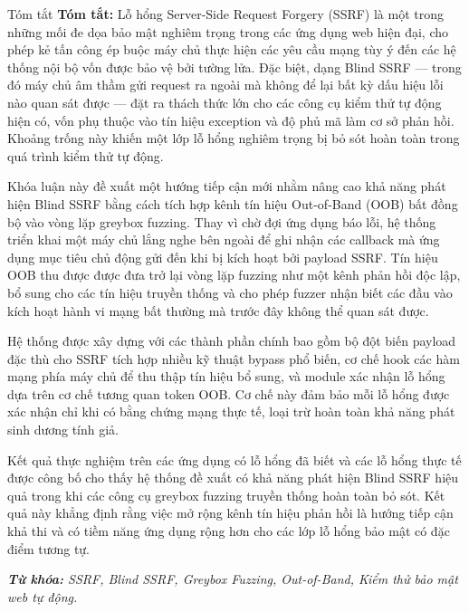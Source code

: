 ﻿\documentclass{uetgraduation}
\begin{document}
\begin{preamble}{Tóm tắt}
\textbf{Tóm tắt:} Lỗ hổng Server-Side Request Forgery (SSRF) là một trong những
mối đe dọa bảo mật nghiêm trọng trong các ứng dụng web hiện đại, cho phép kẻ
tấn công ép buộc máy chủ thực hiện các yêu cầu mạng tùy ý đến các hệ thống
nội bộ vốn được bảo vệ bởi tường lửa. Đặc biệt, dạng Blind SSRF --- trong đó
máy chủ âm thầm gửi request ra ngoài mà không để lại bất kỳ dấu hiệu lỗi nào
quan sát được --- đặt ra thách thức lớn cho các công cụ kiểm thử tự động hiện
có, vốn phụ thuộc vào tín hiệu exception và độ phủ mã làm cơ sở phản hồi.
Khoảng trống này khiến một lớp lỗ hổng nghiêm trọng bị bỏ sót hoàn toàn trong
quá trình kiểm thử tự động.

Khóa luận này đề xuất một hướng tiếp cận mới nhằm nâng cao khả năng phát hiện
Blind SSRF bằng cách tích hợp kênh tín hiệu Out-of-Band (OOB) bất đồng bộ vào
vòng lặp greybox fuzzing. Thay vì chờ đợi ứng dụng báo lỗi, hệ thống triển
khai một máy chủ lắng nghe bên ngoài để ghi nhận các callback mà ứng dụng mục
tiêu chủ động gửi đến khi bị kích hoạt bởi payload SSRF. Tín hiệu OOB thu được
được đưa trở lại vòng lặp fuzzing như một kênh phản hồi độc lập, bổ sung cho
các tín hiệu truyền thống và cho phép fuzzer nhận biết các đầu vào kích hoạt
hành vi mạng bất thường mà trước đây không thể quan sát được.

Hệ thống được xây dựng với các thành phần chính bao gồm bộ đột biến payload
đặc thù cho SSRF tích hợp nhiều kỹ thuật bypass phổ biến, cơ chế hook các hàm
mạng phía máy chủ để thu thập tín hiệu bổ sung, và module xác nhận lỗ hổng dựa
trên cơ chế tương quan token OOB. Cơ chế này đảm bảo mỗi lỗ hổng được xác nhận
chỉ khi có bằng chứng mạng thực tế, loại trừ hoàn toàn khả năng phát sinh dương
tính giả.

Kết quả thực nghiệm trên các ứng dụng có lỗ hổng đã biết và các lỗ hổng thực
tế được công bố cho thấy hệ thống đề xuất có khả năng phát hiện Blind SSRF hiệu
quả trong khi các công cụ greybox fuzzing truyền thống hoàn toàn bỏ sót. Kết
quả này khẳng định rằng việc mở rộng kênh tín hiệu phản hồi là hướng tiếp cận
khả thi và có tiềm năng ứng dụng rộng hơn cho các lớp lỗ hổng bảo mật có đặc
điểm tương tự.

\textit{\textbf{Từ khóa:} SSRF, Blind SSRF, Greybox Fuzzing, Out-of-Band,
Kiểm thử bảo mật web tự động.}
\end{preamble}


\begin{contentlisting}

\tableofcontents

\listoffigures

\listoftables

\end{contentlisting}
\end{document}
